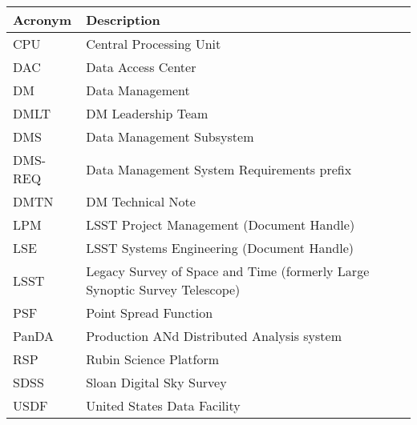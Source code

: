 \addtocounter{table}{-1}
\begin{longtable}{p{}p{}}\hline
\textbf{Acronym} & \textbf{Description}  \\\hline

CPU & Central Processing Unit \\\hline
DAC & Data Access Center \\\hline
DM & Data Management \\\hline
DMLT & DM Leadership Team \\\hline
DMS & Data Management Subsystem \\\hline
DMS-REQ & Data Management System Requirements prefix \\\hline
DMTN & DM Technical Note \\\hline
LPM & LSST Project Management (Document Handle) \\\hline
LSE & LSST Systems Engineering (Document Handle) \\\hline
LSST & Legacy Survey of Space and Time (formerly Large Synoptic Survey Telescope) \\\hline
PSF & Point Spread Function \\\hline
PanDA &  Production ANd Distributed Analysis system \\\hline
RSP & Rubin Science Platform \\\hline
SDSS & Sloan Digital Sky Survey \\\hline
USDF & United States Data Facility \\\hline
\end{longtable}
